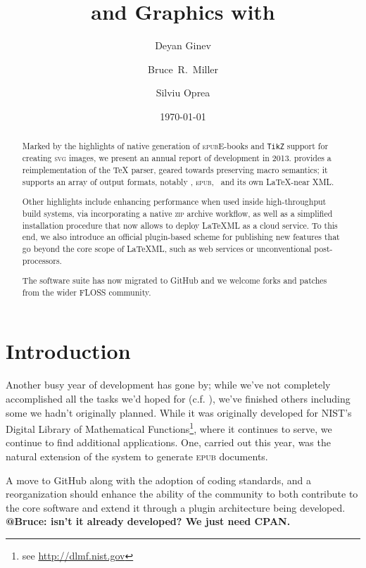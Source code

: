 \documentclass{llncs}
\title{\ebooks and Graphics with \LaTeXML}
\author{Deyan Ginev\inst{1} \and Bruce~R.~Miller\inst{2} \and Silviu Oprea\inst{3}}
\institute{Computer Science, Jacobs University Bremen, Germany
 \and National Institute of Standards and Technology, Gaithersburg, MD, USA
 \and University of Oxford, Oxford, UK.}
\date{\today}
\def\ebooks{\mbox{E-books}\xspace}
\def\epub{\textsc{epub}\xspace}
\def\svg{\textsc{svg}\xspace}
\def\zip{\textsc{zip}\xspace}
\def\tikz{\texttt{TikZ}\xspace}
\begin{document}
\maketitle
\begin{abstract} 
Marked by the highlights of native generation of \epub \ebooks and \tikz support for creating \svg images, we present an annual report of {\LaTeXML} development in 2013. {\LaTeXML} provides a reimplementation of the {\TeX} parser, geared towards preserving macro semantics; it supports an array of output formats, notably , \epub, \XHTML\ and its own \LaTeX-near XML.

Other highlights include enhancing performance when used inside high-throughput build systems, via incorporating a native \zip archive workflow, as well as a simplified installation procedure that now allows to deploy LaTeXML as a cloud service. To this end, we also introduce an official plugin-based scheme for publishing new features that go beyond the core scope of LaTeXML, such as web services or unconventional post-processors.

The software suite has now migrated to GitHub and we welcome forks and patches from the wider FLOSS community.
\end{abstract}

\section{Introduction}
Another busy year of {\LaTeXML} \cite{Miller:latexml:online} development has gone by;
while we've not completely accomplished all the tasks we'd hoped for (c.f. \cite{GinMil:latexmlCICM13}),
we've finished others including some we hadn't originally planned.
While it was originally developed for NIST's Digital Library of Mathematical Functions\footnote{see \url{http://dlmf.nist.gov}},
where it continues to serve, we continue to find additional applications.
One, carried out this year, was the natural extension of the system to generate \epub documents. 

A move to GitHub along with
the adoption of coding standards, and a reorganization should enhance
the ability of the community to both contribute to the core software
and extend it through a plugin architecture being developed. \textbf{@Bruce: isn't it already developed? We just need CPAN.}
\end{document}
